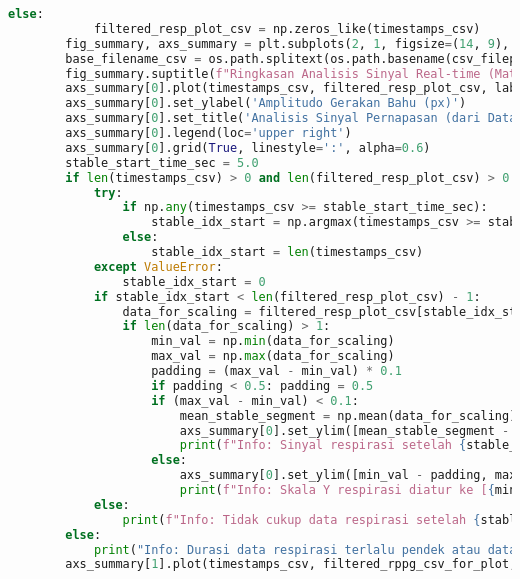 \documentclass[11pt,a4paper]{article}
\begin{document}
\begin{lstlisting}[language=Python, caption=Kelas RealTimeSignalWorker,label={labelkode}]
        else:
            filtered_resp_plot_csv = np.zeros_like(timestamps_csv)
        fig_summary, axs_summary = plt.subplots(2, 1, figsize=(14, 9), sharex=True)
        base_filename_csv = os.path.splitext(os.path.basename(csv_filepath))[0]
        fig_summary.suptitle(f"Ringkasan Analisis Sinyal Real-time (Matplotlib) - {base_filename_csv}", fontsize=16)
        axs_summary[0].plot(timestamps_csv, filtered_resp_plot_csv, label=f'Sinyal Respirasi Terfilter (RR: {rr_result_csv})', color='c', linewidth=1.5)
        axs_summary[0].set_ylabel('Amplitudo Gerakan Bahu (px)')
        axs_summary[0].set_title('Analisis Sinyal Pernapasan (dari Data CSV)')
        axs_summary[0].legend(loc='upper right')
        axs_summary[0].grid(True, linestyle=':', alpha=0.6)
        stable_start_time_sec = 5.0 
        if len(timestamps_csv) > 0 and len(filtered_resp_plot_csv) > 0 and timestamps_csv[-1] > stable_start_time_sec:
            try:
                if np.any(timestamps_csv >= stable_start_time_sec):
                    stable_idx_start = np.argmax(timestamps_csv >= stable_start_time_sec)
                else: 
                    stable_idx_start = len(timestamps_csv) 
            except ValueError: 
                stable_idx_start = 0 
            if stable_idx_start < len(filtered_resp_plot_csv) - 1: 
                data_for_scaling = filtered_resp_plot_csv[stable_idx_start:]
                if len(data_for_scaling) > 1: 
                    min_val = np.min(data_for_scaling)
                    max_val = np.max(data_for_scaling)
                    padding = (max_val - min_val) * 0.1 
                    if padding < 0.5: padding = 0.5 
                    if (max_val - min_val) < 0.1: 
                        mean_stable_segment = np.mean(data_for_scaling)
                        axs_summary[0].set_ylim([mean_stable_segment - 2, mean_stable_segment + 2]) 
                        print(f"Info: Sinyal respirasi setelah {stable_start_time_sec}s hampir datar. Zoom ke +/- 2px.")
                    else:
                        axs_summary[0].set_ylim([min_val - padding, max_val + padding])
                        print(f"Info: Skala Y respirasi diatur ke [{min_val - padding:.2f}, {max_val + padding:.2f}] (berdasarkan data setelah {stable_start_time_sec}s).")
            else:
                print(f"Info: Tidak cukup data respirasi setelah {stable_start_time_sec}s untuk penyesuaian skala Y otomatis.")
        else:
            print("Info: Durasi data respirasi terlalu pendek atau data kosong untuk penyesuaian skala Y otomatis.")
        axs_summary[1].plot(timestamps_csv, filtered_rppg_csv_for_plot, label=f'Sinyal rPPG Terfilter (BPM via POS: {bpm_result_csv})', color='g', linewidth=1.5)

\end{lstlisting}
\end{document}
